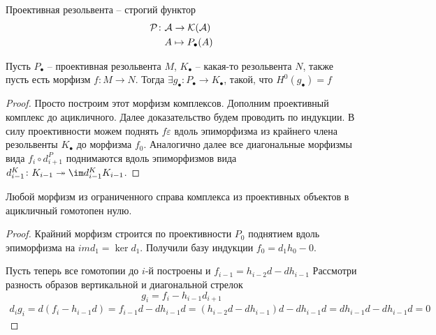 \documentclass[../main.tex]{subfiles}
\begin{document}
\begin{to_suj}\label{tactics}
    Проективная резольвента -- строгий функтор
    \begin{align*}
        \mathcal{P}\colon&\mathcal{A} \to\mathcal{K(A)}\\
         &A \mapsto P_\bullet(A)
    \end{align*}
\end{to_suj}
\begin{to_lem}
    Пусть $P_\bullet$ -- проективная резольвента $M$, $K_\bullet$ -- какая-то резольвента $N$, также пусть есть морфизм $f \colon M \to N$. Тогда $\exists g_\bullet\colon P_\bullet\to K_\bullet$, такой, что $H^0(g_\bullet) = f$
\end{to_lem}
\begin{proof}
    Просто построим этот морфизм комплексов. Дополним проективный комплекс до ацикличного. Далее доказательство будем проводить по индукции.  В силу проективности можем поднять $f\varepsilon$ вдоль эпиморфизма из крайнего члена резольвенты $K_\bullet$ до морфизма $f_0$. Аналогично далее все диагональные морфизмы вида $f_i\circ d_{i+1}^P$ поднимаются вдоль эпиморфизмов вида $d_{i-1}^K\colon K_{i-1}\twoheadrightarrow \im d_{i-1}^K K_{i-1}$.
    \bee
    \eee
\end{proof} 
\begin{to_lem}\label{PtoAc}
    Любой морфизм из ограниченного справа комплекса из проективных объектов в ацикличный гомотопен нулю. 
\end{to_lem}
\begin{proof}
Крайний морфизм строится по проективности $P_0$ поднятием вдоль эпиморфизма на $im d_1 = \ker d_{1}$. Получили базу индукции $f_0 = d_1 h_0 - 0 $.
        \bee
    \eee
Пусть теперь все гомотопии до $i$-й построены и $f_{i-1} = h_{i-2}d - dh_{i-1}$ Рассмотри разность образов вертикальной и диагональной стрелок 
\[g_i = f_i - h_{i-1} d_{i+1} \]
\begin{align*}
       d_i g_i = d(f_i - h_{i-1}d) = f_{i-1}d - d h_{i-1}d = (h_{i-2}d - d h_{i-1})d - d h_{i-1}d = d h_{i-1} d - d h_{i-1} d = 0
\end{align*}
\end{proof}
\end{document}
